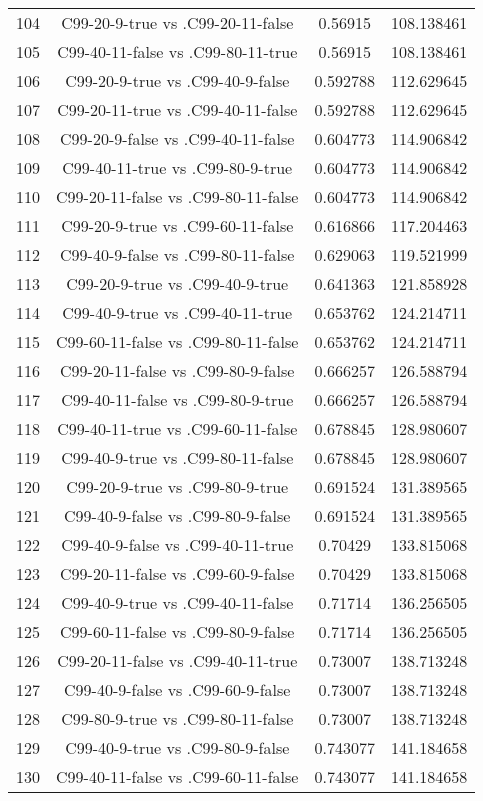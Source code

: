 \documentclass[a4paper,10pt]{article}
\begin{document}
\begin{landscape}
\begin{table}[!htp]
\begin{tabular}{cccc}
104&C99-20-9-true vs .C99-20-11-false&0.56915&108.138461\\
105&C99-40-11-false vs .C99-80-11-true&0.56915&108.138461\\
106&C99-20-9-true vs .C99-40-9-false&0.592788&112.629645\\
107&C99-20-11-true vs .C99-40-11-false&0.592788&112.629645\\
108&C99-20-9-false vs .C99-40-11-false&0.604773&114.906842\\
109&C99-40-11-true vs .C99-80-9-true&0.604773&114.906842\\
110&C99-20-11-false vs .C99-80-11-false&0.604773&114.906842\\
111&C99-20-9-true vs .C99-60-11-false&0.616866&117.204463\\
112&C99-40-9-false vs .C99-80-11-false&0.629063&119.521999\\
113&C99-20-9-true vs .C99-40-9-true&0.641363&121.858928\\
114&C99-40-9-true vs .C99-40-11-true&0.653762&124.214711\\
115&C99-60-11-false vs .C99-80-11-false&0.653762&124.214711\\
116&C99-20-11-false vs .C99-80-9-false&0.666257&126.588794\\
117&C99-40-11-false vs .C99-80-9-true&0.666257&126.588794\\
118&C99-40-11-true vs .C99-60-11-false&0.678845&128.980607\\
119&C99-40-9-true vs .C99-80-11-false&0.678845&128.980607\\
120&C99-20-9-true vs .C99-80-9-true&0.691524&131.389565\\
121&C99-40-9-false vs .C99-80-9-false&0.691524&131.389565\\
122&C99-40-9-false vs .C99-40-11-true&0.70429&133.815068\\
123&C99-20-11-false vs .C99-60-9-false&0.70429&133.815068\\
124&C99-40-9-true vs .C99-40-11-false&0.71714&136.256505\\
125&C99-60-11-false vs .C99-80-9-false&0.71714&136.256505\\
126&C99-20-11-false vs .C99-40-11-true&0.73007&138.713248\\
127&C99-40-9-false vs .C99-60-9-false&0.73007&138.713248\\
128&C99-80-9-true vs .C99-80-11-false&0.73007&138.713248\\
129&C99-40-9-true vs .C99-80-9-false&0.743077&141.184658\\
130&C99-40-11-false vs .C99-60-11-false&0.743077&141.184658\\

\end{tabular}
\end{table}
\end{landscape}
\end{document}
